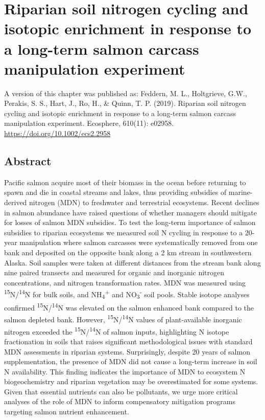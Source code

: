 \documentclass [11pt, proquest] {uwthesis}[2015/03/03]
\begin{document}
\chapter{Riparian soil nitrogen cycling and isotopic enrichment in
response to a long-term salmon carcass manipulation
experiment}\label{riparian-soil-nitrogen-cycling-and-isotopic-enrichment-in-response-to-a-long-term-salmon-carcass-manipulation-experiment}

A version of this chapter was published as: Feddern, M. L., Holtgrieve,
G.W., Perakis, S. S., Hart, J., Ro, H., \& Quinn, T. P. (2019). Riparian
soil nitrogen cycling and isotopic enrichment in response to a long-term
salmon carcass manipulation experiment. Ecosphere, 610(11): e02958.
\url{https://doi.org/10.1002/ecs2.2958}

\section{Abstract}\label{abstract}

Pacific salmon acquire most of their biomass in the ocean before
returning to spawn and die in coastal streams and lakes, thus providing
subsidies of marine-derived nitrogen (MDN) to freshwater and terrestrial
ecosystems. Recent declines in salmon abundance have raised questions of
whether managers should mitigate for losses of salmon MDN subsidies. To
test the long-term importance of salmon subsidies to riparian ecosystems
we measured soil N cycling in response to a 20-year manipulation where
salmon carcasses were systematically removed from one bank and deposited
on the opposite bank along a 2 km stream in southwestern Alaska. Soil
samples were taken at different distances from the stream bank along
nine paired transects and measured for organic and inorganic nitrogen
concentrations, and nitrogen transformation rates. MDN was measured
using \textsuperscript{15}N/\textsuperscript{14}N for bulk soils, and
NH\textsubscript{4}\textsuperscript{+} and
NO\textsubscript{3}\textsuperscript{-} soil pools. Stable isotope
analyses confirmed \textsuperscript{15}N/\textsuperscript{14}N was
elevated on the salmon enhanced bank compared to the salmon depleted
bank. However, \textsuperscript{15}N/\textsuperscript{14}N values of
plant-available inorganic nitrogen exceeded the
\textsuperscript{15}N/\textsuperscript{14}N of salmon inputs,
highlighting N isotope fractionation in soils that raises significant
methodological issues with standard MDN assessments in riparian systems.
Surprisingly, despite 20 years of salmon supplementation, the presence
of MDN did not cause a long-term increase in soil N availability. This
finding indicates the importance of MDN to ecosystem N biogeochemistry
and riparian vegetation may be overestimated for some systems. Given
that essential nutrients can also be pollutants, we urge more critical
analyses of the role of MDN to inform compensatory mitigation programs
targeting salmon nutrient enhancement.
\end{document}
